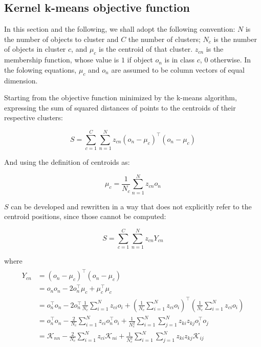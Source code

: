 \documentclass[natbib,smallextended]{svjour3}
\begin{document}
\subsection{Kernel k-means objective function}

In this section and the following, we shall adopt the following convention: $N$ is the number of objects to cluster and $C$ the number of clusters; $N_c$ is the number of objects in cluster $c$, and $\mu_c$ is the centroid of that cluster. $z_{cn}$ is the membership function, whose value is $1$ if object $o_n$ is in class $c$, $0$ otherwise. In the folowing equations, $\mu_c$ and $o_n$ are assumed to be column vectors of equal dimension.

Starting from the objective function minimized by the k-means algorithm, expressing the sum of squared distances of points to the centroids of their respective clusters:

\[
S = \sum_{c=1}^{C} \sum_{n=1}^{N} z_{cn} \left(o_n-\mu_c\right)^\top\left(o_n-\mu_c\right) \label{eq:S}
\]

And using the definition of centroids as:

\[
\mu_c = \frac{1}{N_c}\sum_{n=1}^{N}z_{cn}o_n
\]

$S$ can be developed and rewritten in a way that does not explicitly refer to the centroid positions, since those cannot be computed:

\[
S = \sum_{c=1}^{C} \sum_{n=1}^{N} z_{cn} Y_{cn}
\]

where
\begin{align}
\begin{split}
Y_{cn} & =  \left(o_n-\mu_c\right)^\top\left(o_n-\mu_c\right) \\
       & =  o_no_n - 2 o_n^\top \mu_c + \mu_c^\top \mu_c \\
       & =  o_n^\top o_n - 2 o_n^\top \frac{1}{N_c} \sum_{i=1}^{N} z_{ci} o_i +
       	 \left(\frac{1}{N_c} \sum_{i=1}^{N} z_{ci} o_i\right)^\top
         \left(\frac{1}{N_c} \sum_{i=1}^{N} z_{ci} o_i\right)\\
       & =  o_n^\top o_n - \frac{2}{N_c} \sum_{i=1}^{N} z_{ci} o_n^\top o_i +
       	 \frac{1}{N_c^2} \sum_{i=1}^{N} \sum_{j=1}^{N} z_{ki} z_{kj} o_i^\top o_j \\
       & =  \mathcal{K}_{nn} - \frac{2}{N_c} \sum_{i=1}^{N} z_{ci} \mathcal{K}_{ni} +
         \frac{1}{N_c^2} \sum_{i=1}^{N} \sum_{j=1}^{N} z_{ki} z_{kj} \mathcal{K}_{ij} \label{eq:yki}
\end{split}
\end{align}
\end{document}
